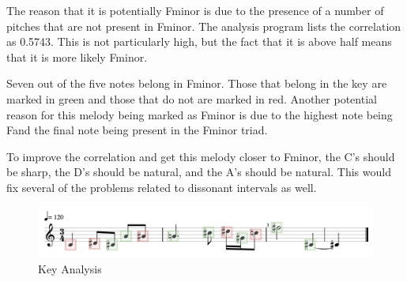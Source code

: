 The reason that it is potentially F\sh minor is due to the presence of a number of pitches that are not present in F\sh minor.  The analysis program lists the correlation as 0.5743.  This is not particularly high, but the fact that it is above half means that it is more likely F\sh minor.

\vspace{\baselineskip}

Seven out of the five notes belong in F\sh minor.  Those that belong in the key are marked in green and those that do not are marked in red.  Another potential reason for this melody being marked as F\sh minor is due to the highest note being F\sh and the final note being present in the F\sh minor triad.

\vspace{\baselineskip}

To improve the correlation and get this melody closer to F\sh minor, the C's should be sharp, the D's should be natural,  and the A's should be natural.  This would fix several of the problems related to dissonant intervals as well.

\begin{figure}[!htbp]
	\centering
	\caption{Key Analysis}
	\includegraphics[scale=0.4]{images/key.png}
\end{figure}